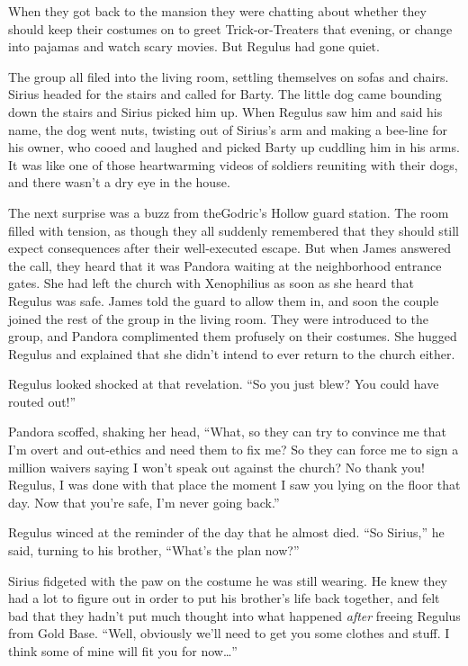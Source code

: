 \documentclass[12pt,twoside,openright]{memoir}
\begin{document}
When they got back to the mansion they were chatting about whether they should keep their costumes on to greet Trick-or-Treaters that evening, or change into pajamas and watch scary movies. But Regulus had gone quiet. 

The group all filed into the living room, settling themselves on sofas and chairs. Sirius headed for the stairs and called for Barty. The little dog came bounding down the stairs and Sirius picked him up. When Regulus saw him and said his name, the dog went nuts, twisting out of Sirius's arm and making a bee-line for his owner, who cooed and laughed and picked Barty up cuddling him in his arms. It was like one of those heartwarming videos of soldiers reuniting with their dogs, and there wasn't a dry eye in the house.

The next surprise was a buzz from theGodric's Hollow guard station. The room filled with tension, as though they all suddenly remembered that they should still expect consequences after their well-executed escape. But when James answered the call, they heard that it was Pandora waiting at the neighborhood entrance gates. She had left the church with Xenophilius as soon as she heard that Regulus was safe. James told the guard to allow them in, and soon the couple joined the rest of the group in the living room. They were introduced to the group, and Pandora complimented them profusely on their costumes. She hugged Regulus and explained that she didn't intend to ever return to the church either.

Regulus looked shocked at that revelation. ``So you just blew? You could have routed out!''

Pandora scoffed, shaking her head, ``What, so they can try to convince me that I'm overt and out-ethics and need them to fix me? So they can force me to sign a million waivers saying I won't speak out against the church? No thank you! Regulus, I was done with that place the moment I saw you lying on the floor that day. Now that you're safe, I'm never going back.''

Regulus winced at the reminder of the day that he almost died. ``So Sirius,'' he said, turning to his brother, ``What's the plan now?''

Sirius fidgeted with the paw on the costume he was still wearing. He knew they had a lot to figure out in order to put his brother's life back together, and felt bad that they hadn't put much thought into what happened
\textit{after} freeing Regulus from Gold Base. ``Well, obviously we'll need to get you some clothes and stuff. I think some of mine will fit you for now…''
\end{document}

